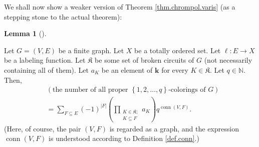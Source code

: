 \documentclass[numbers=enddot,12pt,final,onecolumn,notitlepage]{scrartcl}%
\theoremstyle{definition}
\newtheorem{lem}[theo]{Lemma}
\newenvironment{lemma}[1][]
{\begin{lem}[#1]\begin{leftbar}}
{\end{leftbar}\end{lem}}
\let\sumnonlimits\sum
\let\prodnonlimits\prod
\renewcommand{\sum}{\sumnonlimits\limits}
\renewcommand{\prod}{\prodnonlimits\limits}
\begin{document}
We shall now show a weaker version of Theorem \ref{thm.chrompol.varis} (as a
stepping stone to the actual theorem):

\begin{lemma}
\label{lem.chrompol.weak.varis}Let $G=\left(  V,E\right)  $ be a finite graph.
Let $X$ be a totally ordered set. Let $\ell:E\rightarrow X$ be a labeling
function. Let $\mathfrak{K}$ be some set of broken circuits of $G$ (not
necessarily containing all of them). Let $a_{K}$ be an element of $\mathbf{k}$
for every $K\in\mathfrak{K}$. Let $q\in\mathbb{N}$. Then,%
\begin{align*}
&  \left(  \text{the number of all proper }\left\{  1,2,\ldots,q\right\}
\text{-colorings of }G\right) \\
&  =\sum_{F\subseteq E}\left(  -1\right)  ^{\left\vert F\right\vert }\left(
\prod_{\substack{K\in\mathfrak{K};\\K\subseteq F}}a_{K}\right)
q^{\operatorname*{conn}\left(  V,F\right)  }.
\end{align*}
(Here, of course, the pair $\left(  V,F\right)  $ is regarded as a graph, and
the expression $\operatorname*{conn}\left(  V,F\right)  $ is understood
according to Definition \ref{def.conn}.)
\end{lemma}
\end{document}
